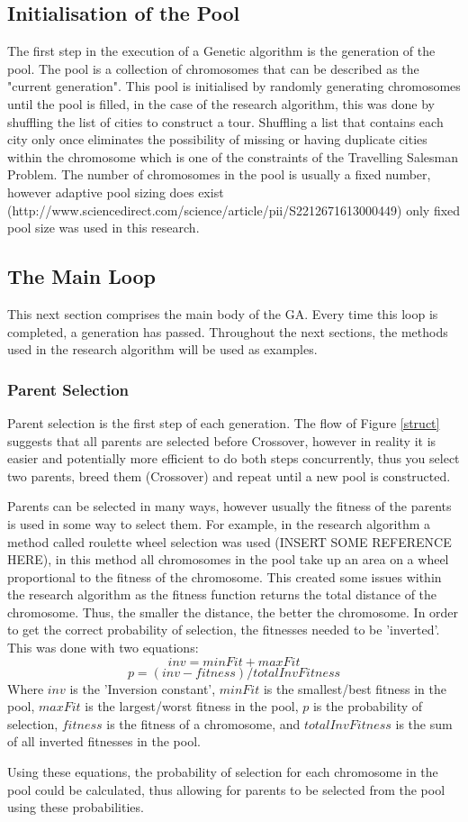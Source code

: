 \subsection{Initialisation of the Pool}
\par
The first step in the execution of a Genetic algorithm is the generation of the pool. The pool is a collection of chromosomes that can be described as the "current generation". This pool is initialised by randomly generating chromosomes until the pool is filled, in the case of the research algorithm, this was done by shuffling the list of cities to construct a tour. Shuffling a list that contains each city only once eliminates the possibility of missing or having duplicate cities within the chromosome which is one of the constraints of the Travelling Salesman Problem. The number of chromosomes in the pool is usually a fixed number, however adaptive pool sizing does exist (http://www.sciencedirect.com/science/article/pii/S2212671613000449) only fixed pool size was used in this research. 
\subsection{The Main Loop}
\par
This next section comprises the main body of the GA. Every time this loop is completed, a generation has passed. Throughout the next sections, the methods used in the research algorithm will be used as examples.
\subsubsection{Parent Selection}\label{parents}
\par
Parent selection is the first step of each generation. The flow of Figure \ref{struct} suggests that all parents are selected before Crossover, however in reality it is easier and potentially more efficient to do both steps concurrently, thus you select two parents, breed them (Crossover) and repeat until a new pool is constructed.
\par
Parents can be selected in many ways, however usually the fitness of the parents is used in some way to select them. For example, in the research algorithm a method called roulette wheel selection was used (INSERT SOME REFERENCE HERE), in this method all chromosomes in the pool take up an area on a wheel proportional to the fitness of the chromosome. This created some issues within the research algorithm as the fitness function returns the total distance of the chromosome. Thus, the smaller the distance, the better the chromosome. In order to get the correct probability of selection, the fitnesses needed to be 'inverted'. This was done with two equations: 
\[ inv = minFit + maxFit\]
\[ p = (inv - fitness)/totalInvFitness\]
Where $inv$ is the 'Inversion constant', $minFit$ is the smallest/best fitness in the pool, $maxFit$ is the largest/worst fitness in the pool, $p$ is the probability of selection, $fitness$ is the fitness of a chromosome, and $totalInvFitness$ is the sum of all inverted fitnesses in the pool.
\par
Using these equations, the probability of selection for each chromosome in the pool could be calculated, thus allowing for parents to be selected from the pool using these probabilities.
